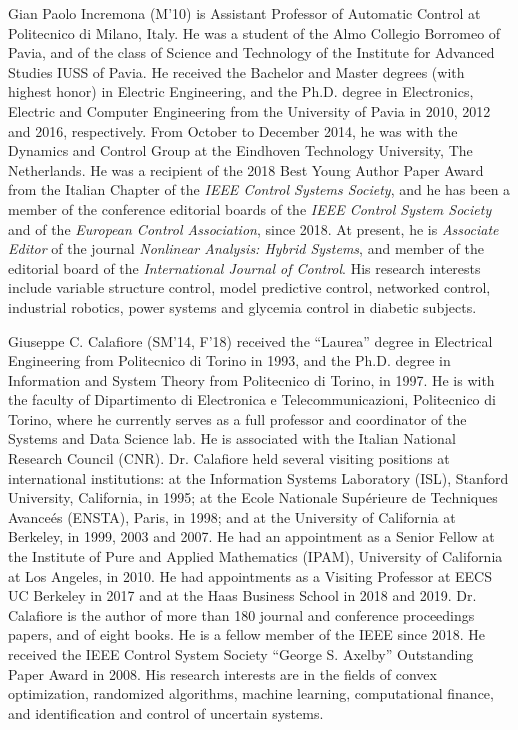 \documentclass[10pt]{IEEEtran}      %
\theoremstyle{theorem}
\theoremstyle{remark}
\begin{document}
\begin{IEEEbiography}
{Gian Paolo Incremona} (M'10) is Assistant Professor of Automatic Control at Politecnico di Milano, Italy. He was a student of the Almo Collegio Borromeo of Pavia, and of the class of Science and Technology of the Institute for Advanced Studies IUSS of Pavia. He received the Bachelor and Master degrees (with highest honor) in Electric Engineering, and the Ph.D. degree in Electronics, Electric and Computer Engineering from the University of Pavia in 2010, 2012 and 2016, respectively. From October to December 2014, he was with the Dynamics and Control Group at the Eindhoven Technology University, The Netherlands. He was a recipient of the 2018 Best Young Author Paper Award from the Italian Chapter of the {\it{IEEE Control Systems Society}}, and he has been a member of the conference editorial boards of the {\it{IEEE Control System Society}} and of the {\it{European Control Association}}, since 2018.  At present, he is {\it{Associate Editor}} of the journal {\it{Nonlinear Analysis: Hybrid Systems}}, and member of the editorial board of the {\it{International Journal of Control}}. His research interests include variable structure control, model predictive control, networked control, industrial robotics, power systems and glycemia control in diabetic subjects. 
 
\end{IEEEbiography}

\begin{IEEEbiography}
    {Giuseppe C. Calafiore}
 (SM'14, F'18) received the ``Laurea'' degree in Electrical Engineering from Politecnico di Torino in 1993, and the Ph.D. degree in Information and System Theory from Politecnico di Torino, in 1997. He is with the faculty of Dipartimento di Electronica e Telecommunicazioni, Politecnico di Torino, where he currently serves as a full professor and coordinator of the Systems and Data Science lab.
 He is  associated with the Italian National Research Council (CNR). 
Dr. Calafiore held several visiting positions at international institutions: at the Information Systems Laboratory (ISL), Stanford University, California, in 1995; at the Ecole Nationale Sup\'erieure de Techniques Avance\'es (ENSTA), Paris, in 1998; and at the University of California at Berkeley, in 1999, 2003 and 2007. He had an appointment as a Senior Fellow at the Institute of Pure and Applied Mathematics (IPAM), University of California at Los Angeles, in 2010. He had appointments as a Visiting Professor at EECS UC Berkeley in 2017 and at the Haas Business School in 2018 and 2019.
 Dr. Calafiore is the author of more than 180 journal and conference proceedings papers, and of eight books. He is a fellow member of the IEEE since 2018. He received the IEEE Control System Society ``George S. Axelby'' Outstanding Paper Award in 2008.  His research interests are in the fields of convex optimization, randomized algorithms, machine learning, computational finance, and identification and control of uncertain systems.
\end{IEEEbiography}
\end{document}
